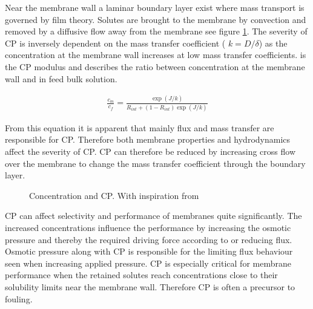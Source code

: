 Near the membrane wall a laminar boundary layer exist where mass transport is governed by film theory.
Solutes are brought to the membrane by convection and removed by a diffusive flow away from the membrane
\citep{mulderBasicPrinciplesMembrane1996}
see figure \cref{fig:flux_concentration_polerization_cp}.
The severity of CP is inversely dependent on the mass transfer coefficient ( $k=D/\delta$) as the concentration at the membrane wall increases at low mass transfer coefficients.
 is the CP modulus and describes the ratio between concentration at the membrane wall and in feed bulk solution.
 \begin{ceqn}
    \begin{align}
     \frac{c_m}{c_f}=\frac{\exp{(J/k)}}{R_{int}+(1-R_{int})\exp{(J/k)}} 
     \label{eqn:CP_mass_transfer_modulus}
     \end{align}
 \end{ceqn}
From this equation it is apparent that mainly flux and mass transfer are responsible for CP.
Therefore both membrane properties and hydrodynamics affect the severity of CP.
CP can therefore be reduced by increasing cross flow over the membrane to change the mass transfer coefficient through the boundary layer. \citep{seaderSeparationProcessPrinciples2006}

 
 \begin{figure}[H]
     \centering
    
     \caption{Concentration and CP. With inspiration from \citep{mulderBasicPrinciplesMembrane1996}}
     \label{fig:flux_concentration_polerization_cp}
 \end{figure}
 
 
CP can affect selectivity and performance of membranes quite significantly. \citep{deonConcentrationPolarizationPhenomenon2013}
The increased concentrations influence the performance by increasing the osmotic pressure and thereby the required driving force according to  or reducing flux.
Osmotic pressure along with CP is responsible for the limiting flux behaviour seen when increasing applied pressure.
CP is especially critical for membrane performance when the retained solutes reach concentrations close to their solubility limits near the membrane wall.
Therefore CP is often a precursor to fouling.
  

